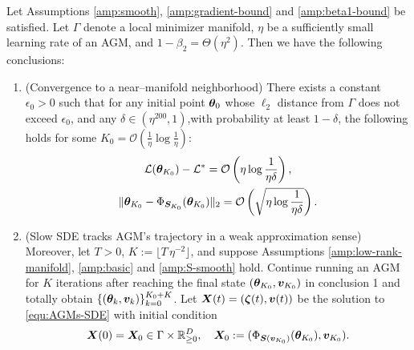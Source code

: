 \begin{theorem}\label{thm:formal-main-result}
Let Assumptions \ref{amp:smooth}, \ref{amp:gradient-bound} and \ref{amp:beta1-bound} be satisfied. Let $\Gamma$ denote a local minimizer manifold, $\eta$ be a sufficiently small learning rate of an AGM, and $1-\beta_2 = \Theta(\eta^2)$. 
Then we have the following conclusions:
\begin{enumerate}
    \item (Convergence to a near–manifold neighborhood) There exists a constant $\epsilon_0 > 0$ such that for any initial point ${\bm{\theta}}_0$ whose $\ell_2$ distance from $\Gamma$ does not exceed $\epsilon_0$, and any $\delta \in (\eta^{200}, 1)$,\footnotemark[3] with probability at least $1 - \delta$, the following holds for some $K_0 = \mathcal{O}(\frac{1}{\eta} \log \frac{1}{\eta})$:
    \begin{gather*}
        \mathcal{L}({\bm{\theta}}_{K_0}) - \mathcal{L}^* = \mathcal{O}\left(\eta\log\frac{1}{\eta\delta}\right),\\
        \|{\bm{\theta}}_{K_0} -\Phi_{{\bm{S}}_{K_0}}({\bm{\theta}}_{K_0})\|_2 = \mathcal{O}\left(\sqrt{\eta\log\frac{1}{\eta\delta}}\right).
    \end{gather*} 
    
    \item (Slow SDE tracks AGM's trajectory in a weak approximation sense) Moreover, let $T > 0$, $K := \lfloor T\,\eta^{-2}\rfloor$, and suppose Assumptions \ref{amp:low-rank-manifold}, \ref{amp:basic} and \ref{amp:S-smooth} hold. Continue running an AGM for $K$ iterations after reaching the final state $({\bm{\theta}}_{K_0},{\bm{v}}_{K_0})$ in conclusion 1 and totally obtain $\{({\bm{\theta}}_k, {\bm{v}}_k)\}_{k=0}^{K_0+K}$. Let ${\bm{X}}(t) =\left({\bm{\zeta}}(t),{\bm{v}}(t)\right)$ be the solution to \eqref{equ:AGMs-SDE} with initial condition
$${\bm{X}}(0) =
{\bm{X}}_0
\in \Gamma \times \mathbb{R}_{\ge 0}^D, \quad {\bm{X}}_0 := (\Phi_{{\bm{S}}({\bm{v}}_{K_0})}({\bm{\theta}}_{K_0}), {\bm{v}}_{K_0}).
$$


\end{enumerate}
\end{theorem}
